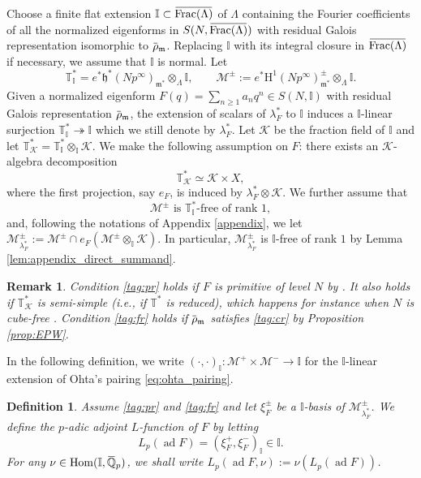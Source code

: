 \documentclass[12pt]{amsart}
\newcommand\bI{\mathbb{I}}
\newcommand\bQ{\mathbb{Q}}
\newcommand\bT{\mathbb{T}}
\newcommand\cK{\mathcal{K}}
\newcommand\cM{\mathcal{M}}
\newcommand\gh{\mathfrak{h}}
\newcommand\gm{\mathfrak{m}}
\newcommand{\ob}[1]{\mkern 1.5mu\overline{\mkern-1.5mu#1\mkern-1.5mu}\mkern 1.5mu}
\DeclareMathOperator{\Hom}{Hom}
\DeclareMathOperator{\Frac}{Frac}
\DeclareMathOperator{\ad}{ad}
\newcommand{\HH}{\mathrm{H}}
\theoremstyle{defstyle}
\newtheorem{definition}[subsubsection]{Definition}
\newtheorem{remark}[subsubsection]{Remark}
\theoremstyle{thmstyle}
\begin{document}
Choose a finite flat extension $\bI\subset \ob{\Frac(\Lambda)}$ of $\Lambda$ containing the Fourier coefficients of all the normalized eigenforms in $S(N,\ob{\Frac(\Lambda)})$ with residual Galois representation isomorphic to $\ob{\rho}_\gm$. Replacing $\bI$ with its integral closure in $\ob{\Frac(\Lambda)}$ if necessary, we assume that $\bI$ is normal. Let 
\[\bT_\bI^*=e^*\gh^*(Np^\infty)_{\gm^*}\otimes_{\Lambda}\bI, \qquad \cM^\pm:=e^*\HH^1(Np^\infty)^\pm_{\gm^*}\otimes_{\Lambda}\bI.\]
Given a normalized eigenform $F(q)=\sum_{n\geq 1}a_nq^n\in S(N,\bI)$ with residual Galois representation $\ob{\rho}_\gm$, the extension of scalars of $\lambda_F^*$ to $\bI$ induces a $\bI$-linear surjection $\bT^*_\bI \twoheadrightarrow \bI$ which we still denote by $\lambda_F^*$. Let $\cK$ be the fraction field of $\bI$ and let $\bT_\cK^*=\bT_\bI^* \otimes_{\bI} \cK$. We make the following assumption on $F$: there exists an $\cK$-algebra decomposition
\begin{equation}
	\bT_\cK^* \simeq \cK \times X, \tag{pr}\label{tag:pr}
\end{equation}
where the first projection, say $e_F$, is induced by $\lambda_F^* \otimes \cK$. We further assume that
\begin{equation}
	\cM^\pm \text{ is $\bT_\bI^*$-free of rank 1}, \tag{fr}\label{tag:fr}
\end{equation}
and, following the notations of Appendix \ref{appendix}, we let $\cM^\pm_{\lambda_F^*}:=\cM^\pm \cap e_F(\cM^\pm \otimes_{\bI}\cK)$. In particular, $\cM^\pm_{\lambda_F^*}$ is $\bI$-free of rank $1$ by Lemma \ref{lem:appendix_direct_summand}.

\begin{remark}\label{rem:conditions_pr_and_fr}
	Condition \eqref{tag:pr} holds if $F$ is primitive of level $N$ by \cite[Thm. 4.2]{hidaAIF}. It also holds if $\bT_\cK^*$ is semi-simple (\textit{i.e.}, if $\bT^*$ is reduced), which happens for instance when $N$ is cube-free \cite[Cor. 1.3]{hida2013inventiones}. Condition \eqref{tag:fr} holds if $\ob{\rho}_\gm$ satisfies \eqref{tag:cr} by Proposition \ref{prop:EPW}.
\end{remark}
In the following definition, we write $(\cdot,\cdot)_\bI \colon \cM^+ \times \cM^- \to \bI$ for the $\bI$-linear extension of Ohta's pairing \eqref{eq:ohta_pairing}.

\begin{definition}\label{def:p_adic_adjoint_L_function}
	Assume \eqref{tag:pr} and \eqref{tag:fr} and let $\xi_F^\pm$ be a $\bI$-basis of $\cM^\pm_{\lambda_F^*}$. We define the $p$-adic adjoint $L$-function of $F$ by letting 
	\[L_p(\ad F)=(\xi^+_F,\xi^-_F)_\bI\in\bI.\]
For any $\nu \in\Hom(\bI,\ob{\bQ}_p)$, we shall write $L_p(\ad F,\nu):=\nu(L_p(\ad F))$.
\end{definition}
\end{document}

